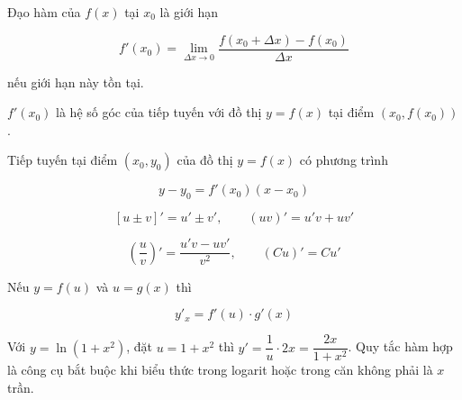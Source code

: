 \documentclass[11pt, a4paper]{article}
\begin{document}
\begin{dinhnghia}
Đạo hàm của $f(x)$ tại $x_0$ là giới hạn

$$f'(x_0) = \lim_{\Delta x \to 0} \frac{f(x_0 + \Delta x) - f(x_0)}{\Delta x}$$

nếu giới hạn này tồn tại.
\end{dinhnghia}
\begin{dinhly}
$f'(x_0)$ là hệ số góc của tiếp tuyến với đồ thị $y = f(x)$ tại điểm $(x_0, f(x_0))$.
\end{dinhly}
\begin{dinhly}
Tiếp tuyến tại điểm $(x_0, y_0)$ của đồ thị $y = f(x)$ có phương trình

$$y - y_0 = f'(x_0)(x - x_0)$$
\end{dinhly}
\begin{dinhly}
\end{dinhly}
\begin{dinhly}
$$[u \pm v]' = u' \pm v', \qquad (uv)' = u'v + uv'$$

$$\left(\frac{u}{v}\right)' = \frac{u'v - uv'}{v^2}, \qquad (Cu)' = Cu'$$
\end{dinhly}
\begin{dinhly}
Nếu $y = f(u)$ và $u = g(x)$ thì

$$y'_x = f'(u) \cdot g'(x)$$

 Với $y = \ln(1 + x^2)$, đặt $u = 1 + x^2$ thì $y' = \dfrac{1}{u} \cdot 2x = \dfrac{2x}{1 + x^2}$. Quy tắc hàm hợp là công cụ bắt buộc khi biểu thức trong logarit hoặc trong căn không phải là $x$ trần.
\end{dinhly}
\end{document}
